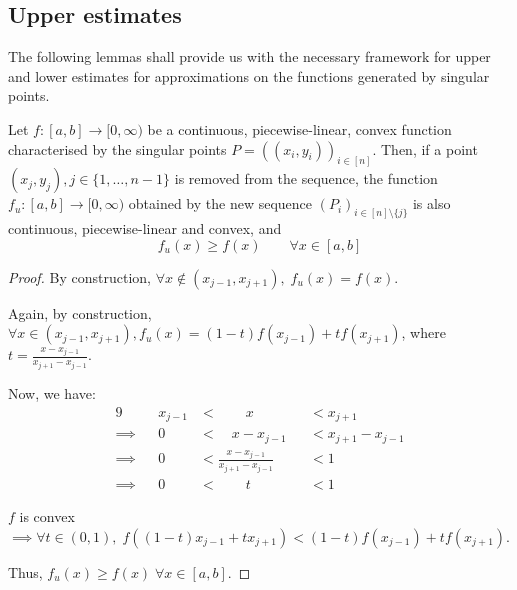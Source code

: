 \subsection{Upper estimates}
\label{subsec:sp-asian-upper-estimates}

The following lemmas shall provide us with the necessary framework for upper and lower estimates for approximations on the functions generated by singular points.

\begin{lmm}
	\label{lmm:sp-asian-upper-estimate}
	Let $ f:[a,b] \to [0, \infty) $ be a continuous, piecewise-linear, convex function characterised by the singular points $ P = ( (x_i, y_i) )_{i \in [n]} $. Then, if a point $ (x_j, y_j), j \in \{ 1, \dots, n-1\} $ is removed from the sequence, the function $ f_u: [a,b] \to [0, \infty) $ obtained by the new sequence $ (P_i)_{i \in [n] \setminus \{ j \}} $ is also continuous, piecewise-linear and convex, and
	\begin{equation}
		f_u(x) \ge f(x) \qquad \forall x \in [a,b]
	\end{equation}
\end{lmm}

\begin{proof}
	By construction, $ \forall x \notin ( x_{j-1} , x_{j+1} ), \; f_u(x) = f(x) $.
	
	Again, by construction, $ \forall x \in ( x_{j-1} , x_{j+1} ), f_u(x) = (1-t) f(x_{j-1}) + t f(x_{j+1}) $, where $ t = \frac{ x - x_{j-1} }{ x_{j+1} - x_{j-1} } $.
	
	Now, we have:
	\begin{alignat*}{9}
		          && x_{j-1}  & <  \qquad x          && <  x_{j+1} \\
		\implies  &&       0  & <  \quad x - x_{j-1} && <  x_{j+1} - x_{j-1} \\
		\implies  &&       0  & <  \frac{ x - x_{j-1} }{ x_{j+1} - x_{j-1} } && <  1 \\
		\implies  &&       0  & <  \qquad t          && <  1
	\end{alignat*}
	
	$f$ is convex $\implies \forall t \in (0,1), \; f( (1-t) x_{j-1} + t x_{j+1} ) < (1-t) f(x_{j-1}) + t f(x_{j+1}) $.
	
	Thus, $ f_u(x) \ge f(x) \; \forall x \in [a,b]$.
\end{proof}

